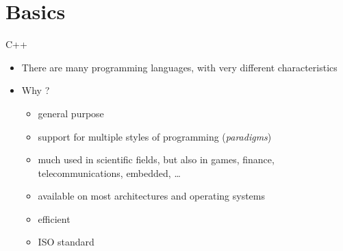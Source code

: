 

\section*{Basics}

\begin{frame}{C++}

  \begin{itemize}[<+->]
  \item There are many programming languages, with very different characteristics
  \item Why \Cpp{}?
    \begin{itemize}[<.->]
    \item general purpose
    \item support for multiple styles of programming (\textit{paradigms})
    \item much used in scientific fields, but also in games, finance,
      telecommunications, embedded, \ldots
    \item available on most architectures and operating systems
    \item efficient
    \item ISO standard
    \end{itemize}
  \end{itemize}
\end{frame}

